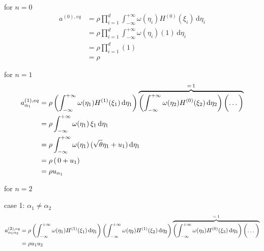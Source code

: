 \documentclass[draft]{article}
\begin{document}
for $n = 0$
\begin{align*}
	a^{(0),eq} &= \rho \prod_{i=1}^{d} \int_{-\infty}^{+\infty} \omega(\eta_i) H^{(0)}(\xi_i) \,\text{d} \eta_i \\
	           &= \rho \prod_{i=1}^{d} \int_{-\infty}^{+\infty} \omega(\eta_i) (1) \,\text{d} \eta_i \\
	           &= \rho \prod_{i=1}^{d} (1) \\
	           &= \rho
\end{align*}

for $n = 1$
\begin{align*}
	a^{(1),eq}_{\alpha_1} &= \rho \left ( \int_{-\infty}^{+\infty} \omega(\eta_1) H^{(1)} ({\xi_1}) \,\text{d} \eta_1 \right ) \overbrace{\left ( \int_{-\infty}^{+\infty} \omega(\eta_2) H^{(0)} (\xi_2) \,\text{d} \eta_2 \right ) \left ( \dots \vphantom{\int} \right )}^{= \, 1} \\
	                      &= \rho \int_{-\infty}^{+\infty} \omega(\eta_1) \, \xi_1 \,\text{d} \eta_1 \\
	                      &= \rho \int_{-\infty}^{+\infty} \omega(\eta_1) \, (\sqrt{\theta} \eta_1 + u_1) \,\text{d} \eta_1 \\
	                      &= \rho \, ( \, 0 + u_1) \\
	                      &= \rho u_{\alpha_1}
\end{align*}
\clearpage

for $n = 2$

case 1: $\alpha_1 \ne \alpha_2$
\small
\begin{align*}
	a^{(2),eq}_{\alpha_1\alpha_2} &= \rho \left ( \int_{-\infty}^{+\infty} \omega(\eta_1) H^{(1)} (\xi_1) \,\text{d} \eta_1 \right ) \left ( \int_{-\infty}^{+\infty} \omega(\eta_2) H^{(1)} (\xi_2) \,\text{d} \eta_2 \right ) \overbrace{\left ( \int_{-\infty}^{+\infty} \omega(\eta_3) H^{(0)} ({\xi_3}) \,\text{d} \eta_3 \right ) \left ( \dots \vphantom{\int} \right )}^{= \, 1} \\
	                              &= \rho u_1 u_2 \\
\end{align*}
\normalsize
\end{document}

